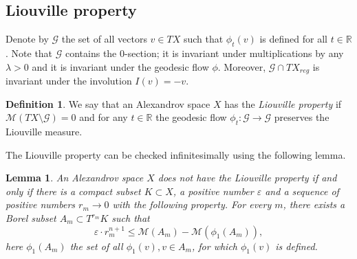 \documentclass[12pt,leqno,intlimits]{amsart}
\numberwithin{equation}{section}
\newtheorem{lem}[thm]{Lemma}
\theoremstyle{definition}
\newtheorem{defn}[thm]{Definition}%
\theoremstyle{remark}
\newcommand{\R}{\mathbb{R}}
\def\:{\colon}
\begin{document}
\subsection{Liouville property}
Denote by $\mathcal G$ the set of all vectors $v\in TX $ such that $\phi _t(v)$ is defined for all $t\in \R$.
Note that $\mathcal G$ contains the $0$-section;
it is invariant under multiplications by any $\lambda>0$
and it is invariant under the geodesic flow $\phi$.
Moreover, $\mathcal G\cap TX_{reg}$ is invariant under the involution $I (v)=-v$.

\begin{defn}
We say that an Alexandrov space $X$ has the \emph{Liouville property} if $\mathcal M(TX\setminus \mathcal G)=0$ and 
for any $t\in \R$ the geodesic flow $\phi _t \:\mathcal G\to \mathcal G$ preserves the Liouville measure.
\end{defn}

The Liouville property can be checked infinitesimally using the following lemma.

\begin{lem} \label{infini}
An Alexandrov space $X$ \emph{does not} have the Liouville property if and only if there is a compact subset $K\subset X$, a positive number
$\varepsilon$ and a sequence of positive numbers $r_m \to 0$ with the following property.
For every $m$, there exists a Borel subset $A_m\subset T^{r_ m} K$ such that
\begin{equation} \label{eq:m}
\varepsilon \cdot r_m^{n +1} \leq \mathcal M (A_m) -\mathcal M (\phi _1 (A_m)),
\end{equation}
here $\phi_1 (A_m)$ the set of all $\phi _1(v), v\in A_m$, for which
$\phi _1(v)$ is defined.
\end{lem}
\end{document}
